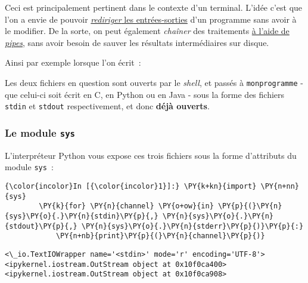 Ceci est principalement pertinent dans le contexte d'un terminal. L'idée
c'est que l'on a envie de pouvoir
\href{http://en.wikipedia.org/wiki/Redirection_\%28computing\%29}{\emph{rediriger}
les entrées-sorties} d'un programme sans avoir à le modifier. De la
sorte, on peut également \emph{chaîner} des traitements
\href{http://en.wikipedia.org/wiki/Redirection_\%28computing\%29\#Piping}{à
l'aide de \emph{pipes}}, sans avoir besoin de sauver les résultats
intermédiaires sur disque.

    Ainsi par exemple lorsque l'on écrit~:

\begin{Shaded}
\begin{Highlighting}[frame=lines,framerule=0.6mm,rulecolor=\color{asisframecolor}]
\NormalTok{$ } \OperatorTok{<}\OperatorTok{>}
\end{Highlighting}
\end{Shaded}

Les deux fichiers en question sont ouverts par le \emph{shell}, et
passés à \texttt{monprogramme} - que celui-ci soit écrit en C, en Python
ou en Java - sous la forme des fichiers \texttt{stdin} et
\texttt{stdout} respectivement, et donc \textbf{déjà ouverts}.

    \hypertarget{le-module-sys}{%
\subsubsection{\texorpdfstring{Le module
\texttt{sys}}{Le module sys}}\label{le-module-sys}}

    L'interpréteur Python vous expose ces trois fichiers sous la forme
d'attributs du module \texttt{sys}~:

    \begin{Verbatim}[commandchars=\\\{\},frame=single,framerule=0.3mm,rulecolor=\color{cellframecolor}]
{\color{incolor}In [{\color{incolor}1}]:} \PY{k+kn}{import} \PY{n+nn}{sys}
        \PY{k}{for} \PY{n}{channel} \PY{o+ow}{in} \PY{p}{(}\PY{n}{sys}\PY{o}{.}\PY{n}{stdin}\PY{p}{,} \PY{n}{sys}\PY{o}{.}\PY{n}{stdout}\PY{p}{,} \PY{n}{sys}\PY{o}{.}\PY{n}{stderr}\PY{p}{)}\PY{p}{:}
            \PY{n+nb}{print}\PY{p}{(}\PY{n}{channel}\PY{p}{)}
\end{Verbatim}


    \begin{Verbatim}[commandchars=\\\{\},frame=single,framerule=0.3mm,rulecolor=\color{cellframecolor}]
<\_io.TextIOWrapper name='<stdin>' mode='r' encoding='UTF-8'>
<ipykernel.iostream.OutStream object at 0x10f0ca400>
<ipykernel.iostream.OutStream object at 0x10f0ca908>
\end{Verbatim}

